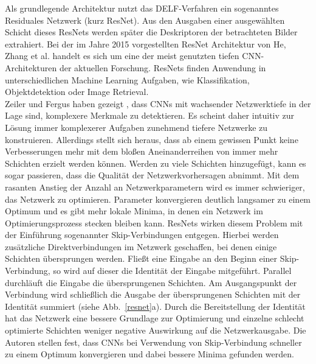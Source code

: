 Als grundlegende Architektur nutzt das DELF-Verfahren ein sogenanntes Residuales Netzwerk (kurz ResNet). Aus den Ausgaben einer ausgewählten Schicht dieses ResNets werden später die Deskriptoren der betrachteten Bilder extrahiert. Bei der im Jahre 2015 vorgestellten ResNet Architektur \cite{resnet} von He, Zhang et al. handelt es sich um eine der meist genutzten tiefen CNN-Architekturen der aktuellen Forschung. ResNets finden Anwendung in unterschiedlichen Machine Learning Aufgaben, wie Klassifikation, Objektdetektion oder Image Retrieval.\\
Zeiler und Fergus haben gezeigt \cite{extraction_point_meaning}, dass CNNs mit wachsender Netzwerktiefe in der Lage sind, komplexere Merkmale zu detektieren. Es scheint daher intuitiv zur Lösung immer komplexerer Aufgaben zunehmend tiefere Netzwerke zu konstruieren. Allerdings stellt sich heraus, dass ab einem gewissen Punkt keine Verbesserungen mehr mit dem bloßen Aneinanderreihen von immer mehr Schichten erzielt werden können. Werden zu viele Schichten hinzugefügt, kann es sogar passieren, dass die Qualität der Netzwerkvorhersagen abnimmt. Mit dem rasanten Anstieg der Anzahl an Netzwerkparametern wird es immer schwieriger, das Netzwerk zu optimieren. Parameter konvergieren deutlich langsamer zu einem Optimum und es gibt mehr lokale Minima, in denen ein Netzwerk im Optimierungsprozess stecken bleiben kann. ResNets wirken diesem Problem mit der Einführung sogenannter Skip-Verbindungen entgegen. Hierbei werden zusätzliche Direktverbindungen im Netzwerk geschaffen, bei denen einige Schichten übersprungen werden. Fließt eine Eingabe an den Beginn einer Skip-Verbindung, so wird auf dieser die Identität der Eingabe mitgeführt. Parallel durchläuft die Eingabe die übersprungenen Schichten. Am Ausgangspunkt der Verbindung wird schließlich die Ausgabe der übersprungenen Schichten mit der Identität summiert (siehe Abb.~\ref{resnet}a). Durch die Bereitstellung der Identität hat das Netzwerk eine bessere Grundlage zur Optimierung und einzelne schlecht optimierte Schichten weniger negative Auswirkung auf die Netzwerkausgabe. Die Autoren stellen fest, dass CNNs bei Verwendung von Skip-Verbindung schneller zu einem Optimum konvergieren und dabei bessere Minima gefunden werden. 
\\
